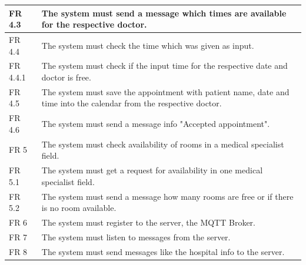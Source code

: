 \begin{table}
\begin{tabular}{|l|l|}
\\ 
\hline
FR 4.3 & The system must send a message which times are available for the respective doctor.                           
\\ 
\hline
\rowcolor[rgb]{0.894,0.894,0.894} 
FR 4.4 & The system must check the time which was given as input.                           
\\ 
\hline
FR 4.4.1 & The system must check if the input time for the respective date and doctor is free.                           
\\ 
\hline
\rowcolor[rgb]{0.894,0.894,0.894} 
FR 4.5 & The system must save the appointment with patient name, date and time into the calendar from the respective doctor.  
\\ 
\hline
FR 4.6 & The system must send a message info "Accepted appointment".                                                   
\\ 
\hline
\rowcolor[rgb]{0.894,0.894,0.894} 
FR 5  & The system must check availability of rooms in a medical specialist field.                                  
\\ 
\hline
FR 5.1  & The system must get a request for availability in one medical specialist field.                             
\\ 
\hline
\rowcolor[rgb]{0.894,0.894,0.894} 
FR 5.2  & The system must send a message how many rooms are free or if there is no room available.                      
\\
\hline
FR 6  & The system must register to the server, the MQTT Broker.                      
\\
\hline
\rowcolor[rgb]{0.894,0.894,0.894} 
FR 7  & The system must listen to messages from the server.                      
\\
\hline
FR 8  & The system must send messages like the hospital info to the server.                      
\\
\hline
\hline
 


\end{tabular}
\end{table}
